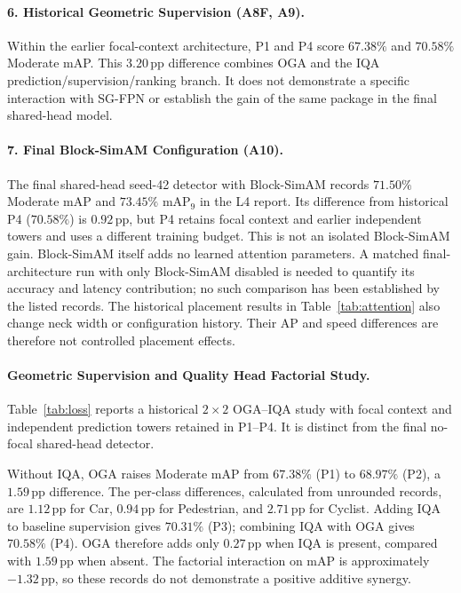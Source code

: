 \paragraph{6. Historical Geometric Supervision (A8F, A9).}
Within the earlier focal-context architecture, P1 and P4 score $67.38\%$ and $70.58\%$ Moderate mAP. This $3.20\,\text{pp}$ difference combines OGA and the IQA prediction/supervision/ranking branch. It does not demonstrate a specific interaction with SG-FPN or establish the gain of the same package in the final shared-head model.

\paragraph{7. Final Block-SimAM Configuration (A10).}
The final shared-head seed-42 detector with Block-SimAM records $71.50\%$ Moderate mAP and $73.45\%$ $\text{mAP}_9$ in the L4 report. Its difference from historical P4 ($70.58\%$) is $0.92\,\text{pp}$, but P4 retains focal context and earlier independent towers and uses a different training budget. This is not an isolated Block-SimAM gain.
Block-SimAM itself adds no learned attention parameters. A matched final-architecture run with only Block-SimAM disabled is needed to quantify its accuracy and latency contribution; no such comparison has been established by the listed records.
The historical placement results in Table~\ref{tab:attention} also change neck width or configuration history. Their AP and speed differences are therefore not controlled placement effects.


\paragraph{Geometric Supervision and Quality Head Factorial Study.}
Table~\ref{tab:loss} reports a historical $2\times2$ OGA--IQA study with focal context and independent prediction towers retained in P1--P4. It is distinct from the final no-focal shared-head detector.



Without IQA, OGA raises Moderate mAP from $67.38\%$ (P1) to $68.97\%$ (P2), a $1.59\,\text{pp}$ difference. The per-class differences, calculated from unrounded records, are $1.12\,\text{pp}$ for Car, $0.94\,\text{pp}$ for Pedestrian, and $2.71\,\text{pp}$ for Cyclist. Adding IQA to baseline supervision gives $70.31\%$ (P3); combining IQA with OGA gives $70.58\%$ (P4). OGA therefore adds only $0.27\,\text{pp}$ when IQA is present, compared with $1.59\,\text{pp}$ when absent. The factorial interaction on mAP is approximately $-1.32\,\text{pp}$, so these records do not demonstrate a positive additive synergy.

